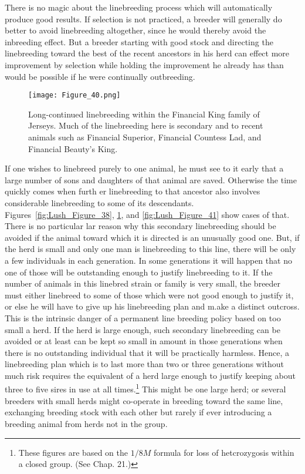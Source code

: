 There is no magic about the linebreeding process which will automatically
produce good results. If selection is not practiced, a breeder
will generally do better to avoid linebreeding altogether, since he would
thereby avoid the inbreeding effect. But a breeder starting with good
stock and directing the linebreeding toward the best of the recent ancestors
in his herd can effect more improvement by selection while holding
the improvement he already has than would be possible if he were continually
outbreeding.

\begin{figure}
	\centering
    \texttt{[image: Figure\_40.png]}
    \caption{Long-continued linebreeding within the Financial King family of Jerseys.
			 Much of the linebreeding here is secondary and to recent animals such as
			 Financial Superior, Financial Countess Lad, and Financial Beauty's King.}
    \label{fig:Lush_Figure_40}
\end{figure}

If one wishes to linebreed purely to one animal, he must see to it
early that a large number of sons and daughters of that animal are
saved. Otherwise the time quickly comes when furth er linebreeding to
that ancestor also involves considerable linebreeding to some of its
descendants. Figures~\ref{fig:Lush_Figure_38}, \ref{fig:Lush_Figure_40},
and \ref{fig:Lush_Figure_41} show cases of that. There is no particular
lar reason why this secondary linebreeding should be avoided if the
animal toward which it is directed is an unusually good one. But, if the
herd is small and only one man is linebreeding to this line, there will be
only a few individuals in each generation. In some generations it will
happen that no one of those will be outstanding enough to justify linebreeding
to it. If the number of animals in this linebred strain or family
is very small, the breeder must either linebreed to some of those which
were not good enough to justify it, or else he will have to give up his
linebreeding plan and m.ake a distinct outcross. This is the intrinsic
danger of a permanent line breeding policy based on too small a herd. If
the herd is large enough, such secondary linebreeding can be avoided or
at least can be kept so small in amount in those generations when there
is no outstanding individual that it will be practically harmless. Hence,
a linebreeding plan which is to last more than two or three generations
without much risk requires the equivalent of a herd large enough to
justify keeping about three to five sires in use at all times.\footnote{These
figures are based on the $1/8M$ formula for loss of hetcrozygosis within
a closed group. (See Chap. 21.)} This might be one large herd; or several
breeders with small herds might co-operate in breeding toward the same line,
exchanging breeding stock with each other but rarely if ever introducing a
breeding animal from herds not in the group.

